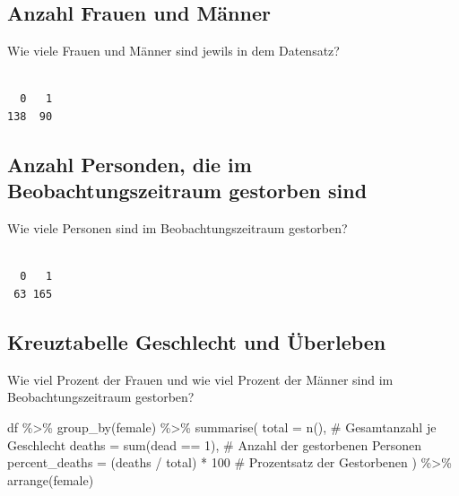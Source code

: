 \documentclass[
  letterpaper,
  DIV=11,
  numbers=noendperiod]{scrartcl}
\newenvironment{Shaded}{\begin{snugshade}}{\end{snugshade}}
\newcommand{\AttributeTok}[1]{\textcolor[rgb]{0.40,0.45,0.13}{#1}}
\newcommand{\CommentTok}[1]{\textcolor[rgb]{0.37,0.37,0.37}{#1}}
\newcommand{\DecValTok}[1]{\textcolor[rgb]{0.68,0.00,0.00}{#1}}
\newcommand{\FunctionTok}[1]{\textcolor[rgb]{0.28,0.35,0.67}{#1}}
\newcommand{\NormalTok}[1]{\textcolor[rgb]{0.00,0.23,0.31}{#1}}
\newcommand{\SpecialCharTok}[1]{\textcolor[rgb]{0.37,0.37,0.37}{#1}}
\begin{document}
\subsection{Anzahl Frauen und Männer}\label{anzahl-frauen-und-muxe4nner}

Wie viele Frauen und Männer sind jewils in dem Datensatz?

\begin{Shaded}
\end{Shaded}

\begin{verbatim}

  0   1 
138  90 
\end{verbatim}

\subsection{Anzahl Personden, die im Beobachtungszeitraum gestorben
sind}\label{anzahl-personden-die-im-beobachtungszeitraum-gestorben-sind}

Wie viele Personen sind im Beobachtungszeitraum gestorben?

\begin{Shaded}
\end{Shaded}

\begin{verbatim}

  0   1 
 63 165 
\end{verbatim}

\subsection{Kreuztabelle Geschlecht und
Überleben}\label{kreuztabelle-geschlecht-und-uxfcberleben}

Wie viel Prozent der Frauen und wie viel Prozent der Männer sind im
Beobachtungszeitraum gestorben?

\begin{Shaded}
\begin{Highlighting}[]
\NormalTok{df }\SpecialCharTok{\%\textgreater{}\%}
  \FunctionTok{group\_by}\NormalTok{(female) }\SpecialCharTok{\%\textgreater{}\%}
  \FunctionTok{summarise}\NormalTok{(}
    \AttributeTok{total =} \FunctionTok{n}\NormalTok{(),                           }\CommentTok{\# Gesamtanzahl je Geschlecht}
    \AttributeTok{deaths =} \FunctionTok{sum}\NormalTok{(dead }\SpecialCharTok{==} \DecValTok{1}\NormalTok{),             }\CommentTok{\# Anzahl der gestorbenen Personen}
    \AttributeTok{percent\_deaths =}\NormalTok{ (deaths }\SpecialCharTok{/}\NormalTok{ total) }\SpecialCharTok{*} \DecValTok{100}  \CommentTok{\# Prozentsatz der Gestorbenen}
\NormalTok{  ) }\SpecialCharTok{\%\textgreater{}\%}
  \FunctionTok{arrange}\NormalTok{(female) }
\end{Highlighting}
\end{Shaded}
\end{document}
